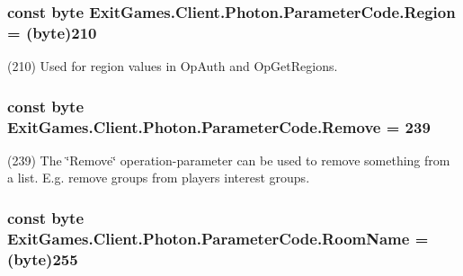 \subsubsection[{\texorpdfstring{Region}{Region}}]{\setlength{\rightskip}{0pt plus 5cm}const byte Exit\+Games.\+Client.\+Photon.\+Parameter\+Code.\+Region = (byte)210}\hypertarget{class_exit_games_1_1_client_1_1_photon_1_1_parameter_code_a7349c22fccf111d81e61d6fc37239939}{}\label{class_exit_games_1_1_client_1_1_photon_1_1_parameter_code_a7349c22fccf111d81e61d6fc37239939}


(210) Used for region values in Op\+Auth and Op\+Get\+Regions.

\subsubsection[{\texorpdfstring{Remove}{Remove}}]{\setlength{\rightskip}{0pt plus 5cm}const byte Exit\+Games.\+Client.\+Photon.\+Parameter\+Code.\+Remove = 239}\hypertarget{class_exit_games_1_1_client_1_1_photon_1_1_parameter_code_ad82cf7aa56c20446c23e6f7b1c341a76}{}\label{class_exit_games_1_1_client_1_1_photon_1_1_parameter_code_ad82cf7aa56c20446c23e6f7b1c341a76}


(239) The \char`\"{}\+Remove\char`\"{} operation-\/parameter can be used to remove something from a list. E.\+g. remove groups from player\textquotesingle{}s interest groups.

\subsubsection[{\texorpdfstring{Room\+Name}{RoomName}}]{\setlength{\rightskip}{0pt plus 5cm}const byte Exit\+Games.\+Client.\+Photon.\+Parameter\+Code.\+Room\+Name = (byte)255}\hypertarget{class_exit_games_1_1_client_1_1_photon_1_1_parameter_code_a50a66ff56a083c37980d0ef14d721c7e}{}\label{class_exit_games_1_1_client_1_1_photon_1_1_parameter_code_a50a66ff56a083c37980d0ef14d721c7e}


